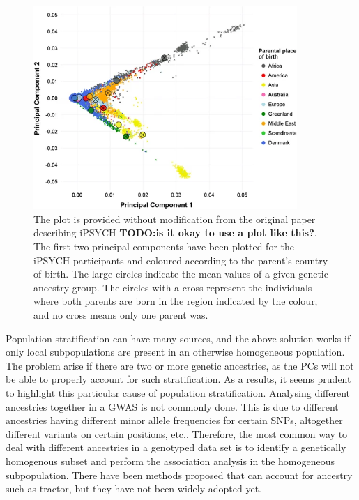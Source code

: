 \begin{figure}
	\includegraphics[width=10cm]{methods/iPSYCH_PCPlot.png}
	\caption[Scatter plot of the first two principal components of iPSYCH 
	participants coloured by parental country of birth]{The plot is provided without modification from the original paper describing 
	iPSYCH \cite{pedersen2018ipsych2012} \textbf{TODO:is it okay 
	to use a plot like this?}. The first two principal components have been 
	plotted for the iPSYCH participants and coloured according to the parent's 
	country of birth. The large circles indicate the mean values of a given 
	genetic ancestry group. The circles with a cross represent the individuals 
	where both parents are born in the region indicated by the colour, and no 
	cross means only one parent was.}
	\label{fig:ipsych_PCPlot}
\end{figure}


Population stratification can have many sources, and the above solution works if only local subpopulations are present in an otherwise homogeneous population. The problem arise if there are two or more genetic ancestries, as the PCs will not be able to properly account for such stratification. As a results, it seems prudent to highlight this particular cause of population stratification. Analysing different ancestries together in a GWAS is not commonly done. This is due to different ancestries having different minor allele frequencies for certain SNPs, altogether different variants on certain positions, etc.\cite{helgason2005icelandic}. Therefore, the most common way to deal with different ancestries in a genotyped data set is to identify a genetically homogenous subset and perform the association analysis in the homogeneous subpopulation. There have been methods proposed that can account for ancestry such as tractor\cite{atkinson2021tractor}, but they have not been widely adopted yet. 

